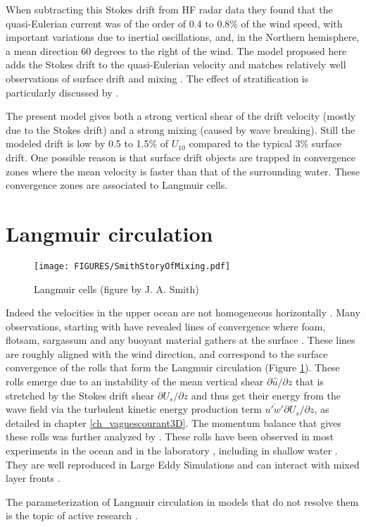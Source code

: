 When subtracting this Stokes drift from HF radar data they found that the quasi-Eulerian current was of the order of 0.4 to 0.8\% of the wind speed, with important variations due to inertial oscillations, and, in the Northern hemisphere, a mean direction 60 degrees to the right of the wind. The model proposed here adds the Stokes drift to the quasi-Eulerian velocity and matches relatively well observations of surface drift and mixing  \citep{Rascle&al.2006}. The effect of stratification is particularly discussed by \cite{Rascle&Ardhuin2009}. 

The present model gives both a strong vertical shear of the drift velocity (mostly due to the Stokes drift) and a strong mixing (caused by wave breaking). 
Still the modeled drift is low by  0.5 to 1.5\% of $U_{10}$ compared to the typical 3\% surface drift. One possible reason is that surface drift objects are trapped in convergence zones where the mean velocity is faster than that of the surrounding water. These convergence zones are associated to Langmuir cells. 

\section{Langmuir circulation}
\begin{figure}
\centerline{\texttt{[image: FIGURES/SmithStoryOfMixing.pdf]}}
  \caption{Langmuir cells (figure by J. A. Smith)} \label{fig_Langmuir}
\end{figure}
Indeed the velocities in the upper ocean are not homogeneous horizontally \citep{Weller&al.1985}. Many observations, starting with 
\cite{Langmuir1938} have revealed lines of convergence where foam, flotsam, sargassum and any buoyant material gathers at the surface \citep{Thorpe&al.2003b}. 
These lines are roughly aligned with the wind direction, and correspond to the surface convergence of the rolls that form the Langmuir circulation (Figure \ref{fig_Langmuir}). These rolls emerge due to an instability of the mean vertical shear $\partial \widehat{u}/ \partial z$ that is  stretched by the Stokes 
drift shear $\partial U_s/ \partial z$  and thus get their energy from the wave field via the turbulent kinetic energy production term $\overline{u'w'}\partial U_s/\partial z$, as detailed in chapter \ref{ch_vaguescourant3D}. The momentum balance that gives 
these rolls was further analyzed by \cite{Suzuki&Fox-Kemper2016}. These rolls have been observed in most experiments in the ocean and in the laboratory \citep[e.g.][]{Thorpe1992,Melville&al.1998,Smith1999}, including in shallow water \citep{Marmorino&al.2005}. They are well reproduced in Large Eddy Simulations \citep[e.g.][]{Noh&al.2004,Harcourt&DAsaro2006,Sullivan&McWilliams2010} and can interact with mixed layer fronts \citep{Suzuki&al.2016}.

The parameterization of Langmuir circulation in models that do not resolve them is the topic of active research \citep[e.g.][]{Li&Fox-Kemper2017}. 


